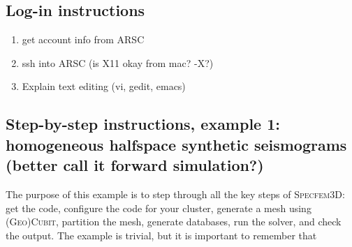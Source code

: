 \documentclass[10pt,fleqn,letterpaper]{article}
\newcommand{\specfem}{\textsc{Specfem3D}}
\newcommand{\cubit}{\textsc{Cubit}}
\begin{document}

\subsection*{Log-in instructions}

\begin{enumerate}
\item get account info from ARSC
\item ssh into ARSC (is X11 okay from mac? -X?)
\item Explain text editing (vi, gedit, emacs)
\end{enumerate}


\subsection*{Step-by-step instructions, example 1: homogeneous halfspace synthetic seismograms (better call it forward simulation?)}

The purpose of this example is to step through all the key steps of \specfem: get the code, configure the code for your cluster, generate a mesh using (\textsc{Geo})\cubit, partition the mesh, generate databases, run the solver, and check the output. The example is trivial, but it is important to remember that 
\end{document}
